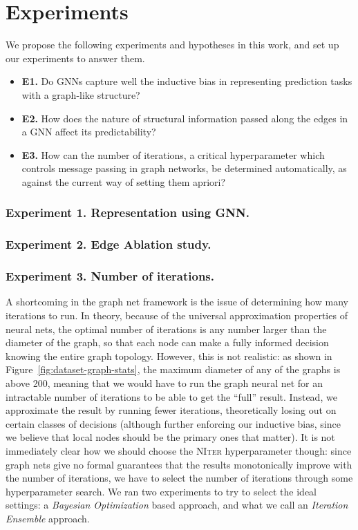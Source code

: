 \section{Experiments}
\label{sec:experiments}
We propose the following experiments and hypotheses in this work, and set up our experiments to answer them.

\begin{itemize}[noitemsep,topsep=0pt]
	\item \textbf{E1.} Do GNNs capture well the inductive bias in representing prediction tasks with a graph-like structure?
	\item \textbf{E2.} How does the nature of structural information passed along the edges in a GNN affect its predictability?
	\item \textbf{E3.} How can the number of iterations, a critical hyperparameter which controls message passing in graph networks, be determined automatically, as against the current way of setting them apriori?
\end{itemize}

\subsubsection{Experiment 1. Representation using GNN.}
\subsubsection{Experiment 2. Edge Ablation study.}
\subsubsection{Experiment 3. Number of iterations.}
A shortcoming in the graph net framework is the issue of determining how many iterations to run.
In theory, because of the universal approximation properties of neural nets, the optimal number of iterations is any number larger than the diameter of the graph, so that each node can make a fully informed decision knowing the entire graph topology.
However, this is not realistic: as shown in Figure~\ref{fig:dataset-graph-stats}, the maximum diameter of any of the graphs is above 200, meaning that we would have to run the graph neural net for an intractable number of iterations to be able to get the ``full'' result.
Instead, we approximate the result by running fewer iterations, theoretically losing out on certain classes of decisions (although further enforcing our inductive bias, since we believe that local nodes should be the primary ones that matter).
It is not immediately clear how we should choose the \textsc{NIter} hyperparameter though: since graph nets give no formal guarantees that the results monotonically improve with the number of iterations, we have to select the number of iterations through some hyperparameter search.
We ran two experiments to try to select the ideal settings: a \emph{Bayesian Optimization} based approach, and what we call an \emph{Iteration Ensemble} approach.


